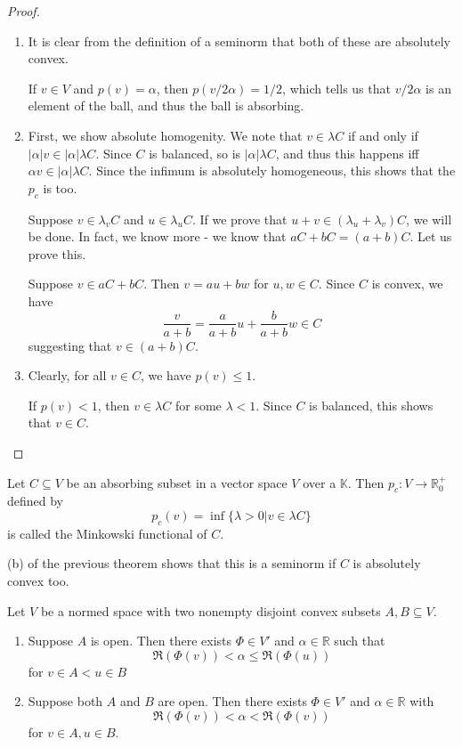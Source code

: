 \documentclass[twoside,symmetric, openany, 12pt]{./tuftebook}
\theoremstyle{definition}
\theoremstyle{definition}
\theoremstyle{definition}
\newenvironment{parts}{\begin{enumerate}[label=(\alph*)]}{\end{enumerate}}
\newcommand{\R}{\mathbb{R}}
\begin{document}
\begin{proof}
	\begin{parts}
		\item It is clear from the definition of a seminorm that both of these are absolutely convex.
		
		If $v\in V$ and $p(v)=\alpha$, then $p(v/2\alpha)=1/2$, which tells us that $v/2\alpha$ is an element of the ball, and thus the ball is absorbing.
		\item First, we show absolute homogenity. We note that $v\in \lambda C$ if and only if $|\alpha| v \in |\alpha|\lambda C$. Since $C$ is balanced, so is $|\alpha|\lambda C$, and thus this happens iff $\alpha v\in |\alpha|\lambda C$. Since the infimum is absolutely homogeneous, this shows that the $p_c$ is too.
		
		Suppose $v\in \lambda_v C$ and $u\in \lambda_u C$. If we prove that $u+v\in (\lambda_u+\lambda_v)C$, we will be done. In fact, we know more - we know that $aC+bC=(a+b)C$. Let us prove this.
		
		Suppose $v\in aC+bC$. Then $v=au+bw$ for $u,w\in C$. Since $C$ is convex, we have
		\[\frac{v}{a+b}=\frac{a}{a+b}u +\frac{b}{a+b}w\in C\]
		suggesting that $v\in (a+b)C$.
		\item Clearly, for all $v\in C$, we have $p(v)\le 1$. 
		
		If $p(v)<1$, then $v\in \lambda C$ for some $\lambda<1$. Since $C$ is balanced, this shows that $v\in C$.\qedhere
	\end{parts}
\end{proof}
\begin{Definition}
	Let $C\subseteq V$ be an absorbing subset in a vector space $V$ over a $\mathbb{K}$. Then $p_c:V\to \R_0^+$ defined by
	\[
	p_c(v)=\inf \{\lambda>0|v\in \lambda C\} 
\]
is called the Minkowski functional of $C$.
\end{Definition}
(b) of the previous theorem shows that this is a seminorm if $C$ is absolutely convex too.
\begin{Theorem}[Separation I]\label{thm:sep1}
	Let $V$ be a normed space with two nonempty disjoint convex subsets $A,B\subseteq V$.
	\begin{parts}
	\item Suppose $A$ is open. Then there exists $\Phi\in V'$ and $\alpha\in \R$ such that
		\[
		\Re(\Phi(v))<\alpha\le \Re(\Phi(u))
	\]
	for $v\in A< u\in B$
\item Suppose both $A$ and $B$ are open. Then there exists $\Phi\in V'$ and $\alpha\in \R$ with
	\[
	\Re(\Phi(v))<\alpha<\Re(\Phi(v))
\]
for $v\in A, u\in B$.
	\end{parts}
\end{Theorem}
\end{document}
